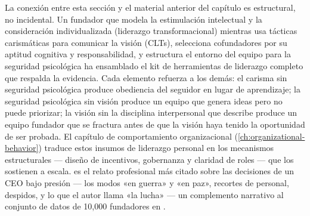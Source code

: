 La conexión entre esta sección y el material anterior del capítulo es estructural, no
incidental. Un fundador que modela la estimulación intelectual y la consideración individualizada
(liderazgo transformacional) mientras usa tácticas carismáticas para comunicar la visión (CLTs),
selecciona cofundadores por su aptitud cognitiva y responsabilidad, y estructura el entorno del
equipo para la seguridad psicológica ha ensamblado el kit de herramientas de liderazgo completo
que respalda la evidencia. Cada elemento refuerza a los demás: el carisma sin seguridad
psicológica produce obediencia del seguidor en lugar de aprendizaje; la seguridad psicológica
sin visión produce un equipo que genera ideas pero no puede priorizar; la visión sin la
disciplina interpersonal que \textcite{wasserman2012founders} describe produce un equipo fundador
que se fractura antes de que la visión haya tenido la oportunidad de ser probada. El capítulo de
comportamiento organizacional (\cref{ch:organizational-behavior}) traduce estos insumos de
liderazgo personal en los mecanismos estructurales --- diseño de incentivos, gobernanza y
claridad de roles --- que los sostienen a escala. \textcite{horowitz2014hard} es el relato profesional más citado sobre las decisiones de un CEO bajo presión --- los modos «en guerra» y «en paz», recortes de personal, despidos, y lo que el autor llama «la lucha» --- un complemento narrativo al conjunto de datos de 10{,}000 fundadores en \textcite{wasserman2012founders}.
